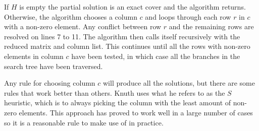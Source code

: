 If $H$ is empty the partial solution is an exact cover and the algorithm returns.
Otherwise, the algorithm chooses a column $c$ and loops through each row $r$ in $c$ with a non-zero element.
Any conflict between row $r$ and the remaining rows are resolved on lines 7 to 11.
The algorithm then calls itself recursively with the reduced matrix and column list.
This continues until all the rows with non-zero elements in column $c$ have been tested, in which case all the branches in the search tree have been traversed.

Any rule for choosing column $c$ will produce all the solutions, but there are some rules that work better than others.
Knuth uses what he refers to as the $S$ heuristic, which is to always picking the column with the least amount of non-zero elements.
This approach has proved to work well in a large number of cases so it is a reasonable rule to make use of in practice.

